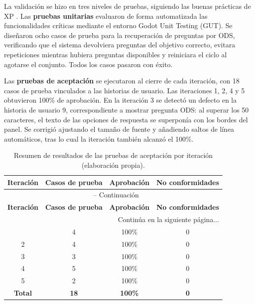 \documentclass[12pt,a4paper]{article}
\begin{document}
La validación se hizo en tres niveles de pruebas, siguiendo las buenas prácticas de XP \citep{Pressman2019}. Las \textbf{pruebas unitarias} evaluaron de forma automatizada las funcionalidades críticas mediante el entorno Godot Unit Testing (GUT). Se diseñaron ocho casos de prueba para la recuperación de preguntas por ODS, verificando que el sistema devolviera preguntas del objetivo correcto, evitara repeticiones mientras hubiera preguntas disponibles y reiniciara el ciclo al agotarse el conjunto. Todos los casos pasaron con éxito.

Las \textbf{pruebas de aceptación} se ejecutaron al cierre de cada iteración, con 18 casos de prueba vinculados a las historias de usuario. Las iteraciones 1, 2, 4 y 5 obtuvieron 100\% de aprobación. En la iteración 3 se detectó un defecto en la historia de usuario 9, correspondiente a mostrar pregunta ODS: al superar los 50 caracteres, el texto de las opciones de respuesta se superponía con los bordes del panel. Se corrigió ajustando el tamaño de fuente y añadiendo saltos de línea automáticos, tras lo cual la iteración también alcanzó el 100\%.

\renewcommand{\arraystretch}{1.3}
\begin{longtable}{|c|c|c|c|}
\caption{Resumen de resultados de las pruebas de aceptación por iteración (elaboración propia).}
\label{tab:resultados_aceptacion}\\
\hline
\textbf{Iteración} & \textbf{Casos de prueba} & \textbf{Aprobación} & \textbf{No conformidades} \\
\hline
\endfirsthead
\multicolumn{4}{c}{\tablename\ \thetable{} -- Continuación}\\
\hline
\textbf{Iteración} & \textbf{Casos de prueba} & \textbf{Aprobación} & \textbf{No conformidades} \\
\hline
\endhead
\hline
\multicolumn{4}{r}{\small Continúa en la siguiente página...}\\
\endfoot
\hline
\endlastfoot
1 & 4 & 100\% & 0 \\
\hline
2 & 4 & 100\% & 0 \\
\hline
3 & 3 & 100\% & 0 \\
\hline
4 & 5 & 100\% & 0 \\
\hline
5 & 2 & 100\% & 0 \\
\hline
\textbf{Total} & \textbf{18} & \textbf{100\%} & \textbf{0} \\
\hline
\end{longtable}

%
\end{document}
